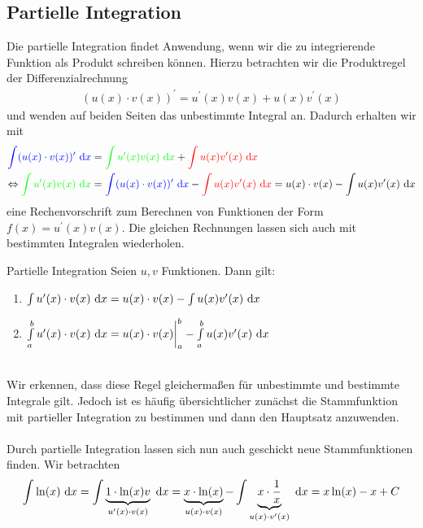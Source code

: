 \subsection{Partielle Integration}
Die partielle Integration findet Anwendung, wenn
wir die zu integrierende Funktion als Produkt schreiben können.
Hierzu betrachten wir die Produktregel der Differenzialrechnung
\begin{align*}
(u(x) \cdot v(x))^\prime = u^\prime(x) v(x) + u(x) v^\prime(x)
\end{align*}
und wenden auf beiden Seiten das unbestimmte Integral an.
Dadurch erhalten wir mit
\begin{align*}
\textcolor{blue}{\int (u(x) \cdot v(x))^\prime \ \text{\rmfamily d} x}
&=
\textcolor{green}{\int u^\prime(x) v(x) \ \text{\rmfamily d} x} 
 + 
 \textcolor{red}{\int u(x) v^\prime(x)\ \text{\rmfamily d} x}
 \\
\Leftrightarrow
\textcolor{green}{\int u^\prime(x) v(x) \ \text{\rmfamily d} x}  &= \textcolor{blue}{\int (u(x) \cdot v(x))^\prime \ \text{\rmfamily d} x} - \textcolor{red}{\int u(x) v^\prime(x)\ \text{\rmfamily d} x}
= u(x) \cdot v(x) - \int u(x) v^\prime(x)\ \text{\rmfamily d} x
\end{align*}
eine Rechenvorschrift zum Berechnen von Funktionen der Form $f(x) = u^\prime(x) v(x)$.
Die gleichen Rechnungen lassen sich auch mit bestimmten Integralen wiederholen.\\
\begin{mybox}{Partielle Integration}
Seien $u, v$ Funktionen.
Dann gilt:
\begin{enumerate}
\item
$\int u^\prime(x) \cdot v(x) \ \text{\rmfamily d} x = u(x) \cdot v(x) - \int u(x) v^\prime(x)\ \text{\rmfamily d} x $
\item
$\int \limits_a^b u^\prime(x) \cdot v(x) \ \text{\rmfamily d} x = u(x) \cdot v(x) \bigg|_a^b - \int \limits_a^b u(x) v^\prime(x)\ \text{\rmfamily d} x $
\end{enumerate}
\end{mybox}
\ \\
Wir erkennen, dass diese Regel gleichermaßen für unbestimmte und bestimmte Integrale gilt.
Jedoch ist es häufig übersichtlicher zunächst die Stammfunktion mit partieller Integration zu bestimmen und dann den Hauptsatz anzuwenden.\\
\\
Durch partielle Integration lassen sich nun auch geschickt neue Stammfunktionen finden.
Wir betrachten 
\begin{align*}
\int \ln(x) \ \text{\rmfamily d} x = 
\int\underbrace{ 1 \cdot \ln(x)v}_{u^\prime(x) \cdot v(x)}\ \text{\rmfamily d} x 
= \underbrace{x \cdot \ln(x)}_{u(x) \cdot v(x)} - \int \underbrace{ x  \cdot \frac{1}{x}}_{u(x) \cdot v^\prime(x)} \ \text{\rmfamily d} x= x \ln(x) -x + C
\end{align*}
